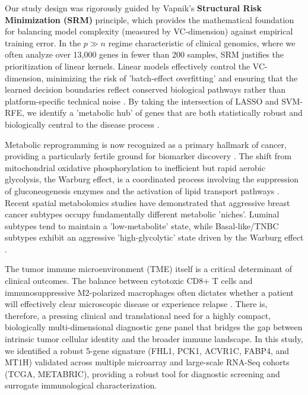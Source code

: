 \documentclass[a4paper,fleqn]{cas-sc}
\begin{document}
Our study design was rigorously guided by Vapnik's \textbf{Structural Risk Minimization (SRM)} principle, which provides the mathematical foundation for balancing model complexity (measured by VC-dimension) against empirical training error. In the $p \gg n$ regime characteristic of clinical genomics, where we often analyze over 13,000 genes in fewer than 200 samples, SRM justifies the prioritization of linear kernels. Linear models effectively control the VC-dimension, minimizing the risk of 'batch-effect overfitting' and ensuring that the learned decision boundaries reflect conserved biological pathways rather than platform-specific technical noise \citep{vapnik1998, statnikov2005, keerthi2003}. By taking the intersection of LASSO and SVM-RFE, we identify a 'metabolic hub' of genes that are both statistically robust and biologically central to the disease process \citep{saeys2007, tang2022}.

Metabolic reprogramming is now recognized as a primary hallmark of cancer, providing a particularly fertile ground for biomarker discovery \citep{hanahan2011}. The shift from mitochondrial oxidative phosphorylation to inefficient but rapid aerobic glycolysis, the Warburg effect, is a coordinated process involving the suppression of gluconeogenesis enzymes and the activation of lipid transport pathways \citep{ma2013}. Recent spatial metabolomics studies have demonstrated that aggressive breast cancer subtypes occupy fundamentally different metabolic 'niches'. Luminal subtypes tend to maintain a 'low-metabolite' state, while Basal-like/TNBC subtypes exhibit an aggressive 'high-glycolytic' state driven by the Warburg effect \citep{zhang2024a, fang2024}.

The tumor immune microenvironment (TME) itself is a critical determinant of clinical outcomes. The balance between cytotoxic CD8+ T cells and immunosuppressive M2-polarized macrophages often dictates whether a patient will effectively clear microscopic disease or experience relapse \citep{denkert2018, mehta2021, loi2019}. There is, therefore, a pressing clinical and translational need for a highly compact, biologically multi-dimensional diagnostic gene panel that bridges the gap between intrinsic tumor cellular identity and the broader immune landscape. In this study, we identified a robust 5-gene signature (FHL1, PCK1, ACVR1C, FABP4, and MT1H) validated across multiple microarray and large-scale RNA-Seq cohorts (TCGA, METABRIC), providing a robust tool for diagnostic screening and surrogate immunological characterization.
\end{document}
